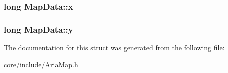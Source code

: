 \subsubsection[{x}]{\setlength{\rightskip}{0pt plus 5cm}long Map\+Data\+::x}\label{structMapData_a52a37fc0f0cb1564824d68a86d0d4c97}
\hypertarget{structMapData_ace819161d4cd3db76cac2f104a9fb78d}{}
\subsubsection[{y}]{\setlength{\rightskip}{0pt plus 5cm}long Map\+Data\+::y}\label{structMapData_ace819161d4cd3db76cac2f104a9fb78d}


The documentation for this struct was generated from the following file\+:\begin{DoxyCompactItemize}
\item 
core/include/\hyperlink{AriaMap_8h}{Aria\+Map.\+h}\end{DoxyCompactItemize}
